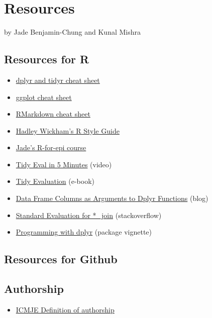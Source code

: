 \documentclass[]{book}
\providecommand{\tightlist}{%
  \setlength{\itemsep}{0pt}\setlength{\parskip}{0pt}}
\begin{document}
\hypertarget{resources}{%
\chapter{Resources}\label{resources}}

by Jade Benjamin-Chung and Kunal Mishra

\hypertarget{resources-for-r}{%
\section{Resources for R}\label{resources-for-r}}

\begin{itemize}
\tightlist
\item
  \href{https://www.rstudio.com/wp-content/uploads/2015/02/data-wrangling-cheatsheet.pdf}{dplyr and tidyr cheat sheet}
\item
  \href{https://www.rstudio.com/wp-content/uploads/2015/03/ggplot2-cheatsheet.pdf}{ggplot cheat sheet}
\item
  \href{https://www.rstudio.com/wp-content/uploads/2015/02/rmarkdown-cheatsheet.pdf}{RMarkdown cheat sheet}
\item
  \href{http://adv-r.had.co.nz/Style.html}{Hadley Wickham's R Style Guide}
\item
  \href{https://ucb-epi-r.github.io}{Jade's R-for-epi course}
\item
  \href{https://www.youtube.com/watch?v=nERXS3ssntw}{Tidy Eval in 5 Minutes} (video)
\item
  \href{https://tidyeval.tidyverse.org/index.html}{Tidy Evaluation} (e-book)
\item
  \href{https://www.brodrigues.co/blog/2016-07-18-data-frame-columns-as-arguments-to-dplyr-functions/}{Data Frame Columns as Arguments to Dplyr Functions} (blog)
\item
  \href{https://stackoverflow.com/questions/28125816/r-standard-evaluation-for-join-dplyr}{Standard Evaluation for *\_join} (stackoverflow)
\item
  \href{https://dplyr.tidyverse.org/articles/programming.html}{Programming with dplyr} (package vignette)
\end{itemize}

\hypertarget{resources-for-github}{%
\section{Resources for Github}\label{resources-for-github}}

\hypertarget{authorship-1}{%
\section{Authorship}\label{authorship-1}}

\begin{itemize}
\tightlist
\item
  \href{http://www.icmje.org/recommendations/browse/roles-and-responsibilities/defining-the-role-of-authors-and-contributors.html}{ICMJE Definition of authorship}
\end{itemize}


\end{document}

